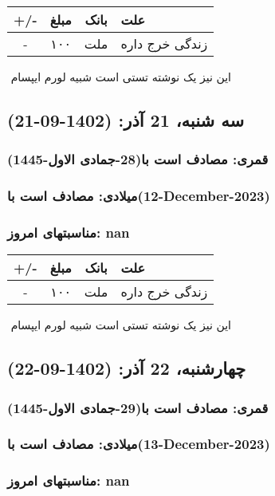 \documentclass{article}
\newcommand{\rnote}[1]{\marginpar{\textcolor{color}{\StrSubstitute{\##1}{ }{\_}}}}
\newcommand{\myRow}[4]{
    #1 & #2 & #3 & #4 \\ \hline
}
\begin{document}
\begin{tabular}{ | c | c | c | p{5cm} |}
    \hline
    \myRow{ +/- }{مبلغ}{بانک}{علت}
    \myRow{-}{۱۰۰}{ملت}{زندگی خرج داره}
\end{tabular}
\newline
\newline

‌
\rnote{تست}
این نیز یک نوشته تستی است شبیه لورم ایپسام




\newpage
{}
\textcolor{color}{
\section{ سه شنبه، 21 آذر: (1402-09-21) }
\subsubsection*{قمری: مصادف است با(28-جمادی الاول-1445)} 
\subsubsection*{میلادی: مصادف است با(12-December-2023)}
\subsubsection*{مناسبتهای امروز: nan}
}


\begin{tabular}{ | c | c | c | p{5cm} |}
    \hline
    \myRow{ +/- }{مبلغ}{بانک}{علت}
    \myRow{-}{۱۰۰}{ملت}{زندگی خرج داره}
\end{tabular}
\newline
\newline

‌
\rnote{تست}
این نیز یک نوشته تستی است شبیه لورم ایپسام




\newpage
{}
\textcolor{color}{
\section{ چهارشنبه، 22 آذر: (1402-09-22) }
\subsubsection*{قمری: مصادف است با(29-جمادی الاول-1445)} 
\subsubsection*{میلادی: مصادف است با(13-December-2023)}
\subsubsection*{مناسبتهای امروز: nan}
}
\end{document}
